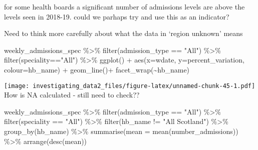 \documentclass[
]{article}
\newenvironment{Shaded}{\begin{snugshade}}{\end{snugshade}}
\newcommand{\AttributeTok}[1]{\textcolor[rgb]{0.77,0.63,0.00}{#1}}
\newcommand{\FunctionTok}[1]{\textcolor[rgb]{0.00,0.00,0.00}{#1}}
\newcommand{\NormalTok}[1]{#1}
\newcommand{\SpecialCharTok}[1]{\textcolor[rgb]{0.00,0.00,0.00}{#1}}
\newcommand{\StringTok}[1]{\textcolor[rgb]{0.31,0.60,0.02}{#1}}
\begin{document}
for some health boards a significant number of admissions levels are
above the levels seen in 2018-19. could we parhaps try and use this as
an indicator?

Need to think more carefully about what the data in `region unknown'
means

\begin{Shaded}
\begin{Highlighting}[]
\NormalTok{weekly\_admissions\_spec }\SpecialCharTok{\%\textgreater{}\%} 
  \FunctionTok{filter}\NormalTok{(admission\_type }\SpecialCharTok{==} \StringTok{"All"}\NormalTok{) }\SpecialCharTok{\%\textgreater{}\%} 
  \FunctionTok{filter}\NormalTok{(speciality}\SpecialCharTok{==}\StringTok{"All"}\NormalTok{) }\SpecialCharTok{\%\textgreater{}\%} 
  \FunctionTok{ggplot}\NormalTok{() }\SpecialCharTok{+}
  \FunctionTok{aes}\NormalTok{(}\AttributeTok{x=}\NormalTok{wdate, }\AttributeTok{y=}\NormalTok{percent\_variation, }\AttributeTok{colour=}\NormalTok{hb\_name) }\SpecialCharTok{+}
  \FunctionTok{geom\_line}\NormalTok{()}\SpecialCharTok{+}
  \FunctionTok{facet\_wrap}\NormalTok{(}\SpecialCharTok{\textasciitilde{}}\NormalTok{hb\_name)}
\end{Highlighting}
\end{Shaded}

\texttt{[image: investigating\_data2\_files/figure-latex/unnamed-chunk-45-1.pdf]}
How is NA calculated - still need to check??

\begin{Shaded}
\begin{Highlighting}[]
\NormalTok{weekly\_admissions\_spec }\SpecialCharTok{\%\textgreater{}\%} 
  \FunctionTok{filter}\NormalTok{(admission\_type }\SpecialCharTok{==} \StringTok{"All"}\NormalTok{) }\SpecialCharTok{\%\textgreater{}\%} 
  \FunctionTok{filter}\NormalTok{(speciality }\SpecialCharTok{==} \StringTok{"All"}\NormalTok{) }\SpecialCharTok{\%\textgreater{}\%} 
  \FunctionTok{filter}\NormalTok{(hb\_name }\SpecialCharTok{!=} \StringTok{"All Scotland"}\NormalTok{) }\SpecialCharTok{\%\textgreater{}\%} 
  \FunctionTok{group\_by}\NormalTok{(hb\_name) }\SpecialCharTok{\%\textgreater{}\%} 
  \FunctionTok{summarise}\NormalTok{(}\AttributeTok{mean =} \FunctionTok{mean}\NormalTok{(number\_admissions)) }\SpecialCharTok{\%\textgreater{}\%} 
  \FunctionTok{arrange}\NormalTok{(}\FunctionTok{desc}\NormalTok{(mean))}
\end{Highlighting}
\end{Shaded}
\end{document}
